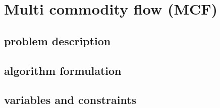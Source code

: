 \section{Multi commodity flow (MCF)}
\subsection{problem description}

\subsection{algorithm formulation}

\subsection{variables and constraints}
